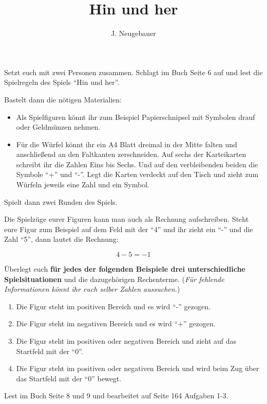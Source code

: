 \documentclass[10pt, a4paper]{scrartcl}
\author{J. Neugebauer}
\title{Hin und her}
\date{\Heute}
\begin{document}
\ReiheTitel

\begin{aufgabe}
	Setzt euch mit zwei Personen zusammen. Schlagt im Buch Seite 6 auf und lest die Spielregeln des Spiels \enquote{Hin und her}.
	
	Bastelt dann die nötigen Materialien:
	
	\begin{itemize}
		\item Als Spielfiguren könnt ihr zum Beispiel Papierschnipsel mit Symbolen drauf oder Geldmünzen nehmen.
		\item Für die Würfel könnt ihr ein A4 Blatt dreimal in der Mitte falten und anschließend an den Faltkanten zerschneiden. Auf sechs der Karteikarten schreibt ihr die Zahlen Eins bis Sechs. Und auf den verbleibenden beiden die Symbole \enquote{+} und \enquote{-}. Legt die Karten verdeckt auf den Tisch und zieht zum Würfeln jeweils eine Zahl und ein Symbol.
	\end{itemize}
	
	Spielt dann zwei Runden des Spiels.
\end{aufgabe}

\begin{aufgabe}
	Die Spielzüge eurer Figuren kann man auch als Rechnung aufschreiben. Steht eure Figur zum Beispiel auf dem Feld mit der \enquote{4} und ihr zieht ein \enquote{-} und die Zahl \enquote{5}, dann lautet die Rechnung:
	
	\[ 4 - 5 = -1 \]
	
	Überlegt euch \textbf{für jedes der folgenden Beispiele drei unterschiedliche Spielsituationen} und die dazugehörigen Rechenterme. (\emph{Für fehlende Informationen könnt ihr euch selber Zahlen aussuchen.})
	
	\begin{enumerate}
		\item Die Figur steht im positiven Bereich und es wird \enquote{-} gezogen.
		\item Die Figur steht im negativen Bereich und es wird \enquote{+} gezogen.
		\item Die Figur steht im positiven oder negativen Bereich und zieht auf das Startfeld mit der \enquote{0}.
		\item Die Figur steht im positiven oder negativen Bereich und wird beim Zug über das Startfeld mit der \enquote{0} bewegt.
	\end{enumerate}
\end{aufgabe}

\begin{aufgabe}[subtitle=Hausaufgabe]
	Lest im Buch Seite 8 und 9 und bearbeitet auf Seite 164 Aufgaben 1-3.
\end{aufgabe}
\end{document}
